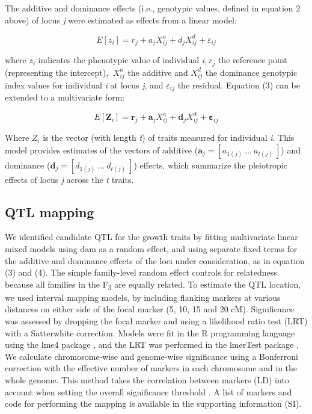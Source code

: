 \begin{refsection}
The additive and dominance effects (i.e., genotypic values, defined in
equation 2 above) of locus \emph{j} were estimated as effects from a
linear model:

\begin{equation}
E\left\lbrack z_{i} \right\rbrack = r_{j} + a_{j}X_{ij}^{a} + d_{j}X_{ij}^{d} + \varepsilon_{ij}
\end{equation}

where \(z_{i}\) indicates the
phenotypic value of individual \emph{i},\(\ r_{j}\) the reference point
(representing the intercept), \(\ X_{ij}^{a}\) the additive and
\(X_{ij}^{d}\) the dominance genotypic index values for
individual \emph{i} at locus \emph{j}, and \(\varepsilon_{ij}\)
the residual. Equation (3) can be extended to a multivariate form:

\begin{equation}
E\left\lbrack \textbf{Z}_{i} \right\rbrack = \textbf{r}_{j} + \textbf{a}_{j}X_{ij}^{a} + \textbf{d}_{j}X_{ij}^{d} + \pmb \varepsilon_{ij}
\end{equation}

Where \(Z_{i}\) is the vector (with length \emph{t}) of traits measured
for individual \emph{i}. This model provides estimates of the vectors of
additive
(\(\textbf{a}_{j} = \left\lbrack a_{1(j)}\ \ldots\ a_{t(j)}\  \right\rbrack\))
and dominance
(\(\textbf{d}_{j} = \left\lbrack d_{1(j)}\ \ldots\ d_{t(j)}\  \right\rbrack\))
effects, which summarize the pleiotropic effects of locus \emph{j}
across the \emph{t} traits.

\subsection{QTL mapping}

We identified candidate QTL for the growth traits by fitting
multivariate linear mixed models using dam as a random effect, and using
separate fixed terms for the additive and dominance effects of the loci
under consideration, as in equation (3) and (4). The simple family-level
random effect controls for relatedness because all families in the
F\textsubscript{3} are equally related. To estimate the QTL location, we
used interval mapping models, by including flanking markers at various
distances on either side of the focal marker (5, 10, 15 and 20 cM).
Significance was assessed by dropping the focal marker and using a
likelihood ratio test (LRT) with a Satterwhite correction. Models were
fit in the R programming language using the lme4 package \parencite{Bates2008-gp}, and
the LRT was performed in the lmerTest package \parencite{Kuznetsova2017-fq}. We
calculate chromosome-wise and genome-wise significance using a
Bonferroni correction with the effective number of markers in each
chromosome and in the whole genome. This method takes the correlation
between markers (LD) into account when setting the overall significance
threshold \parencite{Nyholt2004-zm,Li2005-yu}. A list of markers and code for performing the mapping
is available in the supporting information (SI).


\end{refsection}
